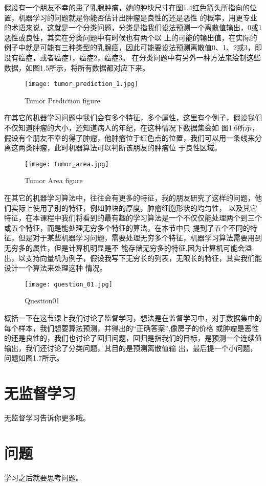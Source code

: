 假设有一个朋友不幸的患了乳腺肿瘤，她的肿块尺寸在图1.4红色箭头所指向的位置，机器学习的问题就是你能否估计出肿瘤是良性的还是恶性
的概率，用更专业的术语来说，这就是一个分类问题，分类是指我们设法预测一个离散值输出，0或1恶性或良性，其实在分类问题中有时候也有两个以
上的可能的输出值，在实际的例子中就是可能有三种类型的乳腺癌，因此可能要设法预测离散值0、1、2或3，即没有癌症，或者癌症1，癌症2，癌症3。
在分类问题中有另外一种方法来绘制这些数据，如图1.5所示，将所有数据都对应下来。
\begin{figure}[H]
\centering
\texttt{[image: tumor\_prediction\_1.jpg]}
\caption{Tumor Prediction figure\label{figur:tumor_prediction_1}}
\end{figure}

在其它的机器学习问题中我们会有多个特征，多个属性，这里有个例子，假设我们不仅知道肿瘤的大小，还知道病人的年纪，在这种情况下数据集会如
图1.6所示，假设有个朋友不幸的得了肿瘤，他肿瘤位于红色点的位置，我们可以用一条线来分离这两类肿瘤，此时机器算法可以判断该朋友的肿瘤位
于良性区域。
\begin{figure}[hbtp]
\centering
\texttt{[image: tumor\_area.jpg]}
\caption{Tumor Area figure\label{figur:tumor_area}}
\end{figure}
在其它的机器学习算法中，往往会有更多的特征，我的朋友研究了这样的问题，他们实际上使用了别的特征，例如肿块的厚度，肿瘤细胞形状的均匀性，
以及其它特征，在本课程中我们将看到的最有趣的学习算法是一个不仅仅能处理两个到三个或五个特征，而是能处理无穷多个特征的算法，在本节中只
提到了五个不同的特征，但是对于某些机器学习问题，需要处理无穷多个特征，机器学习算法需要用到无穷多的属性，但是计算机明显是不
能存储无穷多的特征,因为计算机可能会溢出，以支持向量机为例子，假设我写下无穷长的列表，无限长的特征，其实我们能设计一个算法来处理这种
情况。
\begin{figure}[H]
\centering
\texttt{[image: question\_01.jpg]}
\caption{Question01\label{figur:question_01}}
\end{figure}
概括一下在这节课上我们讨论了监督学习，想法是在监督学习中，对于数据集中的每个样本，我们想要算法预测，并得出的“正确答案”,像房子的价格
或肿瘤是恶性的还是良性的，我们也讨论了回归问题，回归是指我们的目标，是预测一个连续值输出，我们还讨论了分类问题，其目的是预测离散值输
出，最后提一个小问题，问题如图1.7所示。

\section{无监督学习}
无监督学习告诉你更多哦。
\section{问题}
学习之后就要思考问题。